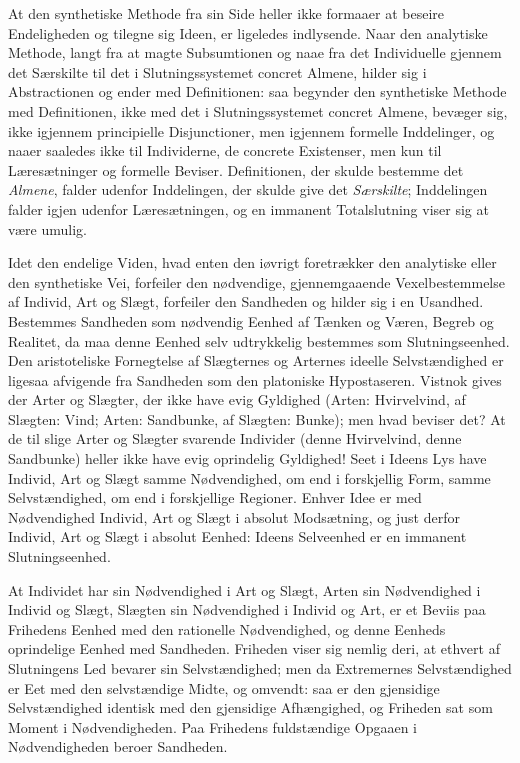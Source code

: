 \documentclass[12pt]{book}
\newcommand{\opage}[1]{\marginnote{\footnotesize\textit{[#1]}}}
\begin{document}
\opage{374}At den synthetiske Methode fra sin Side heller ikke formaaer at beseire Endeligheden og tilegne sig Ideen, er ligeledes indlysende. Naar den analytiske Methode, langt fra at magte Subsumtionen og naae fra det Individuelle gjennem det Særskilte til det i Slutningssystemet concret Almene, hilder sig i Abstractionen og ender med Definitionen: saa begynder den synthetiske Methode med Definitionen, ikke med det i Slutningssystemet concret Almene, bevæger sig, ikke igjennem principielle Disjunctioner, men igjennem formelle Inddelinger, og naaer saaledes ikke til Individerne, de concrete Existenser, men kun til Læresætninger og formelle Beviser. Definitionen, der skulde bestemme det \emph{Almene}, falder udenfor Inddelingen, der skulde give det \emph{Særskilte}; Inddelingen falder igjen udenfor Læresætningen, og en immanent Totalslutning viser sig at være umulig.

Idet den endelige Viden, hvad enten den iøvrigt foretrækker den analytiske eller den synthetiske Vei, forfeiler den nødvendige, gjennemgaaende Vexelbestemmelse af Individ, Art og Slægt, forfeiler den Sandheden og hilder sig i en Usandhed. Bestemmes Sandheden som nødvendig Eenhed af Tænken og Væren, Begreb og Realitet, da maa denne Eenhed selv udtrykkelig bestemmes som Slutningseenhed. Den aristoteliske Fornegtelse af Slægternes og Arternes ideelle Selvstændighed er ligesaa afvigende fra Sandheden som den platoniske Hypostaseren. Vistnok gives der Arter og Slægter, der ikke have evig Gyldighed (Arten: Hvirvelvind, af Slægten: Vind; Arten: Sandbunke, af Slægten: Bunke); men hvad beviser det? At de til slige Arter og Slægter svarende Individer (denne Hvirvelvind, denne Sandbunke) heller ikke have evig oprindelig Gyldighed! Seet i Ideens Lys have Individ, Art og Slægt samme Nødvendighed, om end i forskjellig Form, samme Selvstændighed, om end i forskjellige Regioner. Enhver Idee er med Nødvendighed Individ, Art og Slægt i absolut Modsætning, og just derfor Individ, Art og Slægt i absolut
\opage{375}Eenhed: Ideens Selveenhed er en immanent Slutningseenhed.

At Individet har sin Nødvendighed i Art og Slægt, Arten sin Nødvendighed i Individ og Slægt, Slægten sin Nødvendighed i Individ og Art, er et Beviis paa Frihedens Eenhed med den rationelle Nødvendighed, og denne Eenheds oprindelige Eenhed med Sandheden. Friheden viser sig nemlig deri, at ethvert af Slutningens Led bevarer sin Selvstændighed; men da Extremernes Selvstændighed er Eet med den selvstændige Midte, og omvendt: saa er den gjensidige Selvstændighed identisk med den gjensidige Afhængighed, og Friheden sat som Moment i Nødvendigheden. Paa Frihedens fuldstændige Opgaaen i Nødvendigheden beroer Sandheden.
\end{document}

